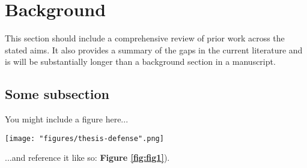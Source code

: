 \center

\section{Background}

\raggedright

This section should include a comprehensive review of prior work across the stated aims. It also provides a summary of the gaps in the current literature and is will be substantially longer than a background section in a manuscript.

\subsection{Some subsection}

You might include a figure here...

\begin{figure*}
  \centering
  \texttt{[image: "figures/thesis-defense".png]}
  \caption{\textbf{The best thesis defense is a good thesis offense.} A conceptual illustration of the celebrated thesis \textit{offense}, an ambitious but often effective tactical maneuver.}
  \label{fig:fig1}
\end{figure*}

...and reference it like so: \textbf{Figure \ref{fig:fig1}}).
